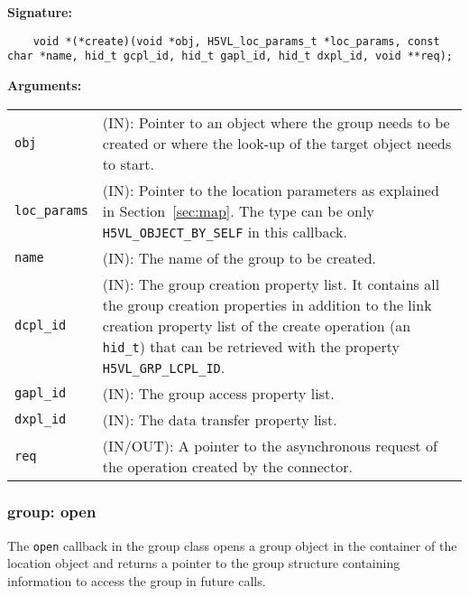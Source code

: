 \begin{mdframed}[style=bgbox]
\textbf{Signature:}
\begin{lstlisting}
    void *(*create)(void *obj, H5VL_loc_params_t *loc_params, const char *name, hid_t gcpl_id, hid_t gapl_id, hid_t dxpl_id, void **req);
\end{lstlisting}

\textbf{Arguments:}\\
\begin{tabular}{l p{13.5cm}}
  \texttt{obj} & (IN): Pointer to an object where the group needs
  to be created or where the look-up of the target object needs to
  start.\\
  \texttt{loc\_params} & (IN): Pointer to the location parameters as explained in
  Section~\ref{sec:map}. The type can be only \texttt{H5VL\_OBJECT\_BY\_SELF} in this callback. \\
  \texttt{name} & (IN): The name of the group to be created.\\
  \texttt{dcpl\_id} & (IN): The group creation property list. It contains
  all the group creation properties in addition to the link creation
  property list of the create operation (an \texttt{hid\_t}) that can be
  retrieved with the property \texttt{H5VL\_GRP\_LCPL\_ID}.\\
  \texttt{gapl\_id} & (IN): The group access property list.\\
  \texttt{dxpl\_id} & (IN): The data transfer property list.\\
  \texttt{req} & (IN/OUT): A pointer to the asynchronous request of the
  operation created by the connector.\\
\end{tabular}
\end{mdframed}

\subsubsection{group: open}
The \texttt{open} callback in the group class opens a group object
in the container of the location object and returns a pointer to the
group structure containing information to access the group in future
calls.\bigskip

